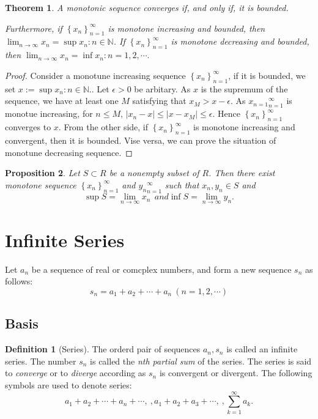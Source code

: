 \documentclass{article}
\newtheorem{theorem}{Theorem}[section]
\newtheorem{prop}[theorem]{Proposition}
\theoremstyle{definition}
\newtheorem{defi}{Definition}[section]
\begin{document}
\begin{theorem}
    A monotonic sequence converges if, and only if, it is bounded.

    Furthermore, if $\left\{x_{n}\right\}_{n=1}^{\infty}$ is monotone increasing and bounded, then $\lim_{n\to \infty} x_{n}=\sup{x_{n}:n\in \mathbb{N}}$.
    If $\left\{x_{n}\right\}_{n=1}^{\infty}$ is monotone decreasing and bounded, then $\lim_{n\rightarrow \infty} x_{n}=\inf{x_{n}:n=1,2,\cdots}.$
\end{theorem}


\begin{proof}
Consider a monotune increasing sequence $\left\{x_{n}\right\}_{n=1}^{\infty}$, if it is bounded, we set $x:=\sup{x_{n}:n\in \mathbb{N}}.$. Let $\epsilon>0$ be arbitary. As $x$
is the supremum of the sequence, we have at least one $M$ satisfying that $x_{M}>x-\epsilon.$ As ${x_{n=1}}^{\infty}_{n=1}$ is monotue increasing, for $n\leq M$, $|x_{n}-x|\leq|x-x_{M}|\leq \epsilon.$ 
Hence $\left\{x_{n}\right\}_{n=1}^{\infty}$  converges to $x$. From the other side, if $\left\{x_{n}\right\}_{n=1}^{\infty}$ is monotone increasing and convergent, then it is bounded. Vise versa, we can prove the situation of monotune decreasing sequence.
\end{proof}  

\begin{prop}
    Let $S\subset R$ be a nonempty subset of $R$. Then there exist monotone sequence $\left\{x_{n}\right\}_{n=1}^{\infty}$ and ${y_{n}}_{n=1}^{\infty}$ such that $x_{n},y_{n}\in S$ and
    $$\sup S = \lim_{n\to \infty}x_{n}\ \ and \inf S = \lim_{n\to \infty}y_{n}.$$ 
\end{prop}




\section{Infinite Series}
Let ${a_{n}}$ be a sequence of real or comcplex
numbers, and form a new sequence ${s_{n}}$ as follows:
$$s_{n}=a_{1}+a_{2}+\cdots +a_{n}\ (n=1,2,\cdots)$$

\subsection{Basis}

\begin{defi}[Series]
The orderd pair of sequences ${a_{n}},{s_{n}}$ is 
called an infinite series. The number $s_{n}$ is called 
the \textit{nth partial sum} of the series. The series is said 
to \textit{converge} or to \textit{diverge} according 
as ${s_{n}}$ is convergent or divergent. The following 
symbols are used to denote series:
$$a_{1}+a_{2}+\cdots +a_{n}+\cdots,\ ,a_{1}+a_{2}+a_{3}+\cdots,\ ,\sum_{k=1}^{\infty}a_{k}.$$
\end{defi}
\end{document}

